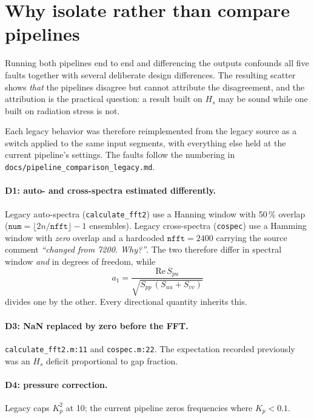 \documentclass[11pt]{article}
\begin{document}
\section{Why isolate rather than compare pipelines}

Running both pipelines end to end and differencing the outputs confounds all five
faults together with several deliberate design differences. The resulting scatter
shows \emph{that} the pipelines disagree but cannot attribute the disagreement,
and the attribution is the practical question: a result built on $H_s$ may be
sound while one built on radiation stress is not.

Each legacy behavior was therefore reimplemented from the legacy source as a
switch applied to the same input segments, with everything else held at the
current pipeline's settings. The faults follow the numbering in
\texttt{docs/pipeline\_comparison\_legacy.md}.

\paragraph{D1: auto- and cross-spectra estimated differently.}
Legacy auto-spectra (\texttt{calculate\_fft2}) use a Hanning window with
50\,\% overlap ($\texttt{num} = \lfloor 2n/\texttt{nfft}\rfloor - 1$ ensembles).
Legacy cross-spectra (\texttt{cospec}) use a Hamming window with \emph{zero}
overlap and a hardcoded $\texttt{nfft} = 2400$ carrying the source comment
\emph{``changed from 7200. Why?''}. The two therefore differ in spectral window
\emph{and} in degrees of freedom, while
\begin{equation}
    a_1 = \frac{\mathrm{Re}\,S_{pu}}{\sqrt{S_{pp}\,(S_{uu}+S_{vv})}}
\end{equation}
divides one by the other. Every directional quantity inherits this.

\paragraph{D3: NaN replaced by zero before the FFT.}
\texttt{calculate\_fft2.m:11} and \texttt{cospec.m:22}. The expectation recorded
previously was an $H_s$ deficit proportional to gap fraction.

\paragraph{D4: pressure correction.}
Legacy caps $K_p^2$ at 10; the current pipeline zeros frequencies where
$K_p < 0.1$.
\end{document}
